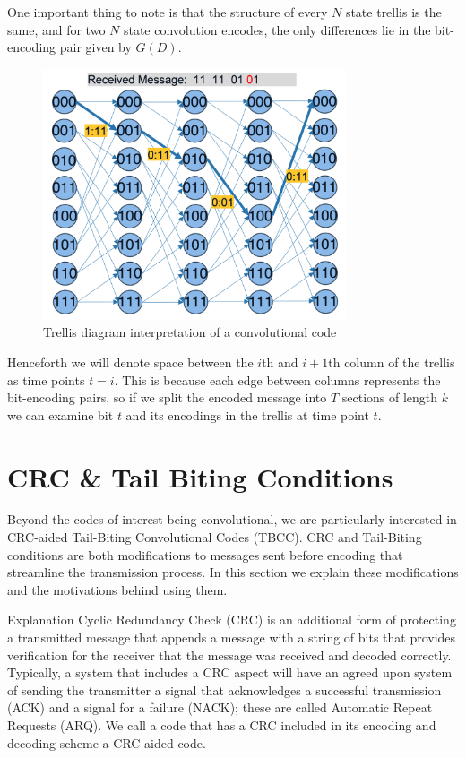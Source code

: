 One important thing to note is that the structure of every $N$ state trellis is the same, and for two $N$ state convolution encodes, the only differences lie in the bit-encoding pair given by $G(D)$. 

\begin{figure}
\centering\CaptionFontSize
\includegraphics[height=20em]
{Figures/convolutional_code_trellis.png}
\caption[Trellis diagram interpretation of a convolutional code]
{Trellis diagram interpretation of a convolutional code}
\label{Figure:Background:ConvolutionalCodeTrellisDiagram}
\end{figure}

Henceforth we will denote space between the $i$th and $i+1$th column of the trellis as time points $t=i$. This is because each edge between columns represents the bit-encoding pairs, so if we split the encoded message into $T$ sections of length $k$ we can examine bit $t$ and its encodings in the trellis at time point $t$. 

\section{CRC \& Tail Biting Conditions}

Beyond the codes of interest being convolutional, we are particularly interested in CRC-aided Tail-Biting Convolutional Codes (TBCC). CRC and Tail-Biting conditions are both modifications to messages sent before encoding that streamline the transmission process. In this section we explain these modifications and the motivations behind using them.

Explanation
Cyclic Redundancy Check (CRC) is an additional form of protecting a transmitted message that appends a message with a string of bits that provides verification for the receiver that the message was received and decoded correctly. Typically, a system that includes a CRC aspect will have an agreed upon system of sending the transmitter a signal that acknowledges a successful transmission (ACK) and a signal for a failure (NACK); these are called Automatic Repeat Requests (ARQ). We call a code that has a CRC included in its encoding and decoding scheme a CRC-aided code. 


